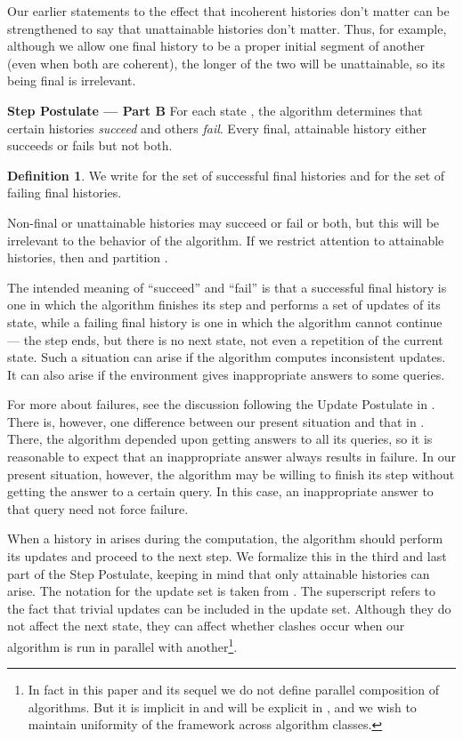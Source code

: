 \documentclass{LMCS}
\theoremstyle{definition}
\newtheorem{df}[thm]{Definition}
\newenvironment{unn}[1]{\bigskip\noindent\textbf{#1}\quad}{\par\bigskip}
\begin{document}
Our earlier statements to the effect that incoherent histories don't
matter can be strengthened to say that unattainable histories don't
matter.  Thus, for example, although we allow one final history to be
a proper initial segment of another (even when both are coherent), the
longer of the two will be unattainable, so its being final is
irrelevant.

\begin{unn}{Step Postulate --- Part B}
  For each state , the algorithm determines that certain histories
  \emph{succeed} and others \emph{fail}.  Every final, attainable
  history either succeeds or fails but not both.  
\end{unn}

\begin{df}
  We write  for the set of successful final histories and
   for the set of failing final histories.
\end{df}

Non-final or unattainable histories may succeed or fail or both, but
this will be irrelevant to the behavior of the algorithm.  If we
restrict attention to attainable histories, then  and  partition .

The intended meaning of ``succeed'' and ``fail'' is that a successful
final history is one in which the algorithm finishes its step and
performs a set of updates of its state, while a failing final history
is one in which the algorithm cannot continue --- the step ends, but
there is no next state, not even a repetition of the current state.
Such a situation can arise if the algorithm computes inconsistent
updates.  It can also arise if the environment gives inappropriate
answers to some queries.

For more about failures, see the discussion following the Update
Postulate in \cite[Section~5]{oa1}.  There is, however, one difference
between our present situation and that in \cite{oa1}.  There, the
algorithm depended upon getting answers to all its queries, so it is
reasonable to expect that an inappropriate answer always results in
failure.  In our present situation, however, the algorithm may be
willing to finish its step without getting the answer to a certain
query.  In this case, an inappropriate answer to that query need not
force failure.

When a history in  arises during the computation, the
algorithm should perform its updates and proceed to the next step.
We formalize this in the third and last part of the Step Postulate,
keeping in mind that only attainable histories can arise.  The
notation  for the update set is taken from \cite{oa1}.  The
superscript  refers to the fact that trivial updates can be
included in the update set.  Although they do not affect the next
state, they can affect whether clashes occur when our algorithm is
run in parallel with another\footnote{In fact in this paper and
    its sequel \cite{ga2} we
do not define parallel composition of algorithms. But it is implicit
in \cite{oa3} and will be explicit in \cite{composite}, and we wish
to maintain uniformity of the framework across algorithm classes.}.
\end{document}
